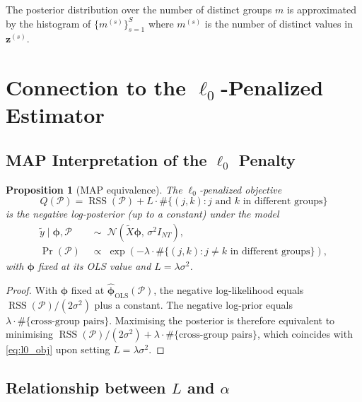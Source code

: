 \documentclass[12pt]{article}
\newtheorem{proposition}{Proposition}
\DeclareMathOperator{\RSS}{RSS}
\newcommand{\Normal}{\mathcal{N}}
\newcommand{\1}{\mathbbm{1}}
\newcommand{\ytd}{\tilde{y}}
\newcommand{\Xtd}{\tilde{X}}
\begin{document}
The posterior distribution over the number of distinct groups $m$ is
approximated by the histogram of $\{m^{(s)}\}_{s=1}^{S}$ where
$m^{(s)}$ is the number of distinct values in $\bm{z}^{(s)}$.

\section{Connection to the $\ell_0$-Penalized Estimator}

\subsection{MAP Interpretation of the $\ell_0$ Penalty}

\begin{proposition}[MAP equivalence]
  The $\ell_0$-penalized objective
  \begin{equation}
    Q(\mathcal{P}) = \RSS(\mathcal{P}) + L\cdot\#\{(j,k): j\text{ and }k\text{ in different groups}\}
    \label{eq:l0_obj}
  \end{equation}
  is the negative log-posterior (up to a constant) under the model
  \begin{align}
    \ytd\mid\bm{\phi},\mathcal{P} &\;\sim\; \Normal(\Xtd\bm{\phi},\,\sigma^2 I_{NT}),\\
    \Pr(\mathcal{P}) &\;\propto\; \exp\!\left(-\lambda\cdot\#\{(j,k): j\neq k\text{ in different groups}\}\right),
  \end{align}
  with $\bm{\phi}$ fixed at its OLS value and $L = \lambda\sigma^2$.
\end{proposition}

\begin{proof}
  With $\bm{\phi}$ fixed at $\hat{\bm{\phi}}_{\mathrm{OLS}}(\mathcal{P})$, the
  negative log-likelihood equals $\RSS(\mathcal{P})/(2\sigma^2)$ plus a constant.
  The negative log-prior equals $\lambda\cdot\#\{\text{cross-group pairs}\}$.
  Maximising the posterior is therefore equivalent to minimising
  $\RSS(\mathcal{P})/(2\sigma^2) + \lambda\cdot\#\{\text{cross-group pairs}\}$,
  which coincides with \eqref{eq:l0_obj} upon setting $L = \lambda\sigma^2$.
\end{proof}

\subsection{Relationship between $L$ and $\alpha$}
\end{document}
